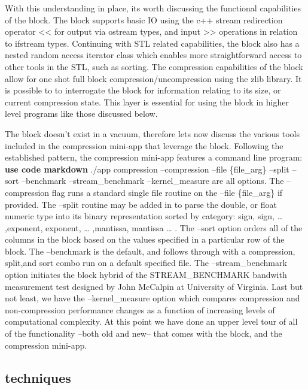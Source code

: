 \documentclass[12pt,twocolumn]{article}
\begin{document}
With this understanding in place, its worth discussing the functional
capabilities of the block. The block supports basic IO using the c++
stream redirection operator \textless{}\textless{} for output via
ostream types, and input \textgreater{}\textgreater{} operations in
relation to ifstream types. Continuing with STL related capabilities,
the block also has a nested random access iterator class which enables
more straightforward access to other tools in the STL, such as sorting.
The compression capabilities of the block allow for one shot full block
compression/uncompression using the zlib library. It is possible to to
interrogate the block for information relating to its size, or current
compression state. This layer is essential for using the block in higher
level programs like those discussed below.

The block doesn't exist in a vacuum, therefore lets now discuss the
various tools included in the compression mini-app that leverage the
block. Following the established pattern, the compression mini-app
features a command line program: \textbf{use code markdown} ./app
compression --compression --file \{file\_arg\} --split --sort
--benchmark --stream\_benchmark --kernel\_measure are all options. The
--compression flag runs a standard single file routine on the --file
\{file\_arg\} if provided. The --split routine may be added in to parse
the double, or float numeric type into its binary representation sorted
by category: sign, sign, \ldots{} ,exponent, exponent, \ldots{}
,mantissa, mantissa \ldots{} . The --sort option orders all of the
columns in the block based on the values specified in a particular row
of the block. The --benchmark is the default, and follows through with a
compression, split,and sort combo run on a default specified file. The
--stream\_benchmark option initiates the block hybrid of the
STREAM\_BENCHMARK bandwith measurement test designed by John McCalpin at
University of Virginia. Last but not least, we have the
--kernel\_measure option which compares compression and non-compression
performance changes as a function of increasing levels of computational
complexity. At this point we have done an upper level tour of all of the
functionality --both old and new-- that comes with the block, and the
compression mini-app.

\subsection{techniques}\label{techniques}
\end{document}
